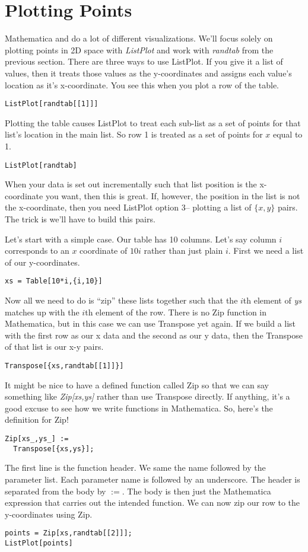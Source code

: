 \documentclass[]{tufte-handout}
\begin{document}
\section{Plotting Points}

Mathematica and do a lot of different visualizations. We'll focus solely on plotting points in 2D space with \textit{ListPlot} and work with \textit{randtab} from the previous section. There are three ways to use ListPlot. If you give it a list of values, then it treats those values as the y-coordinates and assigns each value's location as it's x-coordinate. You see this when you plot a row of the table.
\begin{verbatim}
ListPlot[randtab[[1]]]
\end{verbatim}
Plotting the table causes ListPlot to treat each sub-list as a set of points for that list's location in the main list. So row 1 is treated as a set of points for $x$ equal to 1. 
\begin{verbatim}
ListPlot[randtab]
\end{verbatim}
When your data is set out incrementally such that list position is the x-coordinate you want, then this is great. If, however, the position in the list is not the x-coordinate, then you need ListPlot  option 3-- plotting a list of $\{x,y\}$ pairs. The trick is we'll have to build this pairs. 

Let's start with a simple case. Our table has 10 columns. Let's say column $i$ corresponds to an $x$ coordinate of $10i$ rather than just plain $i$. First we need a list of our y-coordinates.
\begin{verbatim}
xs = Table[10*i,{i,10}]
\end{verbatim}
Now all we need to do is ``zip'' these lists together such that the $i$th element of \textit{ys} matches up with the $i$th element of the row. There is no Zip function in Mathematica, but in this case we can use Transpose yet again. If we build a list with the first row as our x data and the second as our y data, then the Transpose of that list is our x-y pairs.
\begin{verbatim}
Transpose[{xs,randtab[[1]]}]
\end{verbatim} 

It might be nice to have a defined function called Zip so that we can say something like \textit{Zip[xs,ys]} rather than use Transpose directly. If anything, it's a good excuse to see how we write functions in Mathematica.  So, here's the definition for Zip!
\begin{verbatim}
Zip[xs_,ys_] := 
  Transpose[{xs,ys}];
\end{verbatim}
The first line is the function header. We same the name followed by the parameter list. Each parameter name is followed by an underscore. The header is separated from the body by $:=$. The body is then just the Mathematica expression that carries out the intended function. We can now zip our row to the y-coordinates using Zip.
\begin{verbatim}
points = Zip[xs,randtab[[2]]];
ListPlot[points]
\end{verbatim} 
\end{document}
